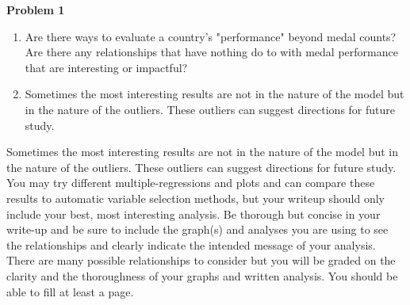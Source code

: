 \documentclass{article}
\newenvironment{problem}[2][Problem]
    { \begin{mdframed}[backgroundcolor=gray!20] \textbf{#1 #2} \\}
    {  \end{mdframed}}
\begin{document}
\begin{problem}{1}
\begin{enumerate}
	\item Are there ways to evaluate a country's "performance" beyond medal counts? Are there any relationships that have nothing do to with medal performance that are interesting or impactful?
	\item Sometimes the most interesting results are not in the nature of the model but in the nature of the outliers. These outliers can suggest directions for future study.
\end{enumerate}
Sometimes the most interesting results are not in the nature of the model but in the nature of the outliers. These outliers can suggest directions for future study.
\newline
You may try different multiple-regressions and plots and can compare these results to automatic variable selection methods, but your writeup should only include your best, most interesting analysis. Be thorough but concise in your write-up and be sure to include the graph(s) and analyses you are using to see the relationships and clearly indicate the intended message of your analysis. There are many possible relationships to consider but you will be graded on the clarity and the thoroughness of your graphs and written analysis. You should be able to fill at least a page.
\end{problem}
\newpage
\end{document}
